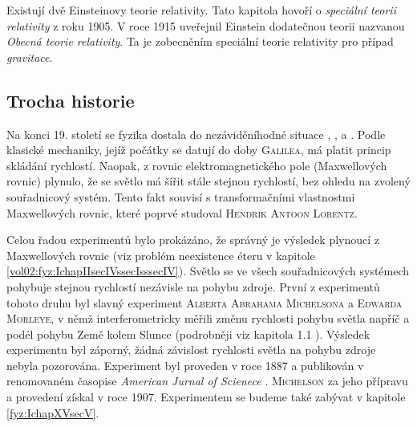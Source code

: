     Existují dvě Einsteinovy teorie relativity. Tato kapitola hovoří o \emph{speciální teorii 
    relativity} z roku \num{1905}. V roce \num{1915} uveřejnil Einstein dodatečnou teorii nazvanou 
    \emph{Obecná teorie relativity}. Ta je zobecněním speciální teorie relativity pro případ 
    \emph{gravitace}.

    \subsection{Trocha historie}
      Na konci 19. století se fyzika dostala do nezáviděníhodné situace \cite{Semerak2012},
      \cite{Beiser1975}, \cite{Stoll2009} a \cite{Semerak2005}. Podle klasické mechaniky, jejíž
      počátky se datují do doby \textsc{Galilea}, má platit princip skládání rychlostí. Naopak, z
      rovnic elektromagnetického pole (Maxwellových rovnic) plynulo, že se světlo má šířit stále
      stejnou rychlostí, bez ohledu na zvolený souřadnicový systém. Tento fakt souvisí s
      transformačními vlastnostmi Maxwellových rovnic, které poprvé studoval \textsc{Hendrik Antoon
      Lorentz}.


      Celou řadou experimentů bylo prokázáno, že správný je výsledek plynoucí z Maxwellových rovnic
      (viz problém neexistence éteru v kapitole \ref{vol02:fyz:IchapIIsecIVssecIsssecIV}). Světlo
      se ve všech souřadnicových systémech pohybuje stejnou rychlostí nezávisle na pohybu zdroje.
      První z experimentů tohoto druhu byl slavný experiment \textsc{Alberta Abrahama Michelsona} a
      \textsc{Edwarda Morleye}, v němž interferometricky měřili změnu rychlosti pohybu světla napříč
      a podél pohybu Země kolem Slunce (podrobněji viz kapitola 1.1 \cite[s.~17]{Beiser1975}).
      Výsledek experimentu byl záporný, žádná závislost rychlosti světla na pohybu zdroje nebyla
      pozorována. Experiment byl proveden v roce 1887 a publikován v renomovaném časopise
      \emph{American Jurnal of Scienece} \cite[s.~22]{MichelMorl1887}. \textsc{Michelson} za jeho
      přípravu a provedení získal \wikiNobelPriceList v roce 1907. Experimentem se budeme také
      zabývat v kapitole \ref{fyz:IchapXVsecV}. 

